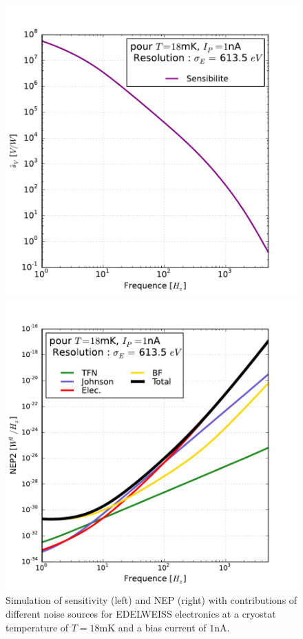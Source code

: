 \begin{figure}[!ht]
\begin{minipage}{0.49\textwidth}
\includegraphics[width=\textwidth]{Figures/Ethem/sv_fin.pdf}
\end{minipage}
\hfill
\begin{minipage}{0.49\textwidth}
\includegraphics[width=\textwidth]{Figures/Ethem/nep_fin.pdf}
\end{minipage}
\caption{Simulation of sensitivity (left) and NEP (right) with contributions of different noise sources for EDELWEISS electronics at a cryostat temperature of $T=18$mK and a bias current of $1$nA.}
\label{fig:nep-fig}
\end{figure}


